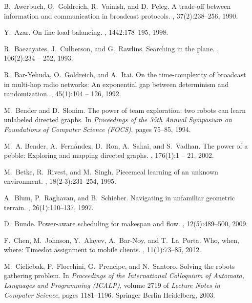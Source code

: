 \documentclass{article}
\begin{document}
\begin{thebibliography}{10}
B.~Awerbuch, O.~Goldreich, R.~Vainish, and D.~Peleg.
\newblock A trade-off between information and communication in broadcast
  protocols.
, 37(2):238--256, 1990.

Y.~Azar.
\newblock On-line load balancing.
, 1442:178--195, 1998.

R.~Baezayates, J.~Culberson, and G.~Rawlins.
\newblock Searching in the plane.
, 106(2):234 -- 252, 1993.

R.~Bar-Yehuda, O.~Goldreich, and A.~Itai.
\newblock On the time-complexity of broadcast in multi-hop radio networks: An
  exponential gap between determinism and randomization.
, 45(1):104 -- 126,
  1992.

M.~Bender and D.~Slonim.
\newblock The power of team exploration: two robots can learn unlabeled
  directed graphs.
\newblock In {\em Proceedings of the 35th
  Annual Symposium on Foundations of Computer Science (FOCS)}, pages 75--85, 1994.

M.~A. Bender, A.~Fernández, D.~Ron, A.~Sahai, and S.~Vadhan.
\newblock The power of a pebble: Exploring and mapping directed graphs.
, 176(1):1 -- 21, 2002.

M.~Betke, R.~Rivest, and M.~Singh.
\newblock Piecemeal learning of an unknown environment.
, 18(2-3):231--254, 1995.

A.~Blum, P.~Raghavan, and B.~Schieber.
\newblock Navigating in unfamiliar geometric terrain.
, 26(1):110--137, 1997.

D.~Bunde.
\newblock Power-aware scheduling for makespan and flow.
, 12(5):489--500, 2009.

F.~Chen, M.~Johnson, Y.~Alayev, A.~Bar-Noy, and T.~La~Porta.
\newblock Who, when, where: Timeslot assignment to mobile clients.
, 11(1):73--85, 2012.

M.~Cieliebak, P.~Flocchini, G.~Prencipe, and N.~Santoro.
\newblock Solving the robots gathering problem.
\newblock In {\em Proceedings of the International Colloquium of Automata, Languages and Programming (ICALP)},
  volume 2719 of {\em Lecture Notes in Computer Science}, pages 1181--1196.
  Springer Berlin Heidelberg, 2003.


\end{thebibliography}
\end{document}
